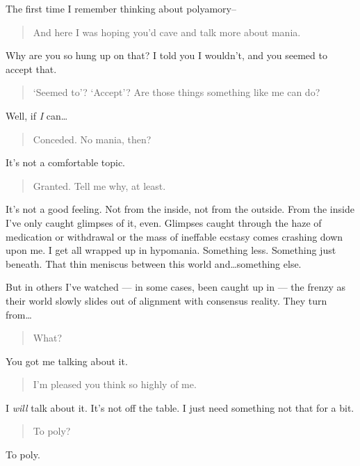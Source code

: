 The first time I remember thinking about polyamory--

\begin{quote}
And here I was hoping you'd cave and talk more about mania.
\end{quote}

Why are you so hung up on that? I told you I wouldn't, and you seemed to accept that.

\begin{quote}
`Seemed to'? `Accept'? Are those things something like me can do?
\end{quote}

Well, if \emph{I} can\ldots{}

\begin{quote}
Conceded. No mania, then?
\end{quote}

It's not a comfortable topic.

\begin{quote}
Granted. Tell me why, at least.
\end{quote}

It's not a good feeling. Not from the inside, not from the outside. From the inside I've only caught glimpses of it, even. Glimpses caught through the haze of medication or withdrawal or the mass of ineffable ecstasy comes crashing down upon me. I get all wrapped up in hypomania. Something less. Something just beneath. That thin meniscus between this world and\ldots{}something else.

But in others I've watched --- in some cases, been caught up in --- the frenzy as their world slowly slides out of alignment with consensus reality. They turn from\ldots{}

\begin{quote}
What?
\end{quote}

You got me talking about it.

\begin{quote}
I'm pleased you think so highly of me.
\end{quote}

I \emph{will} talk about it. It's not off the table. I just need something not that for a bit.

\begin{quote}
To poly?
\end{quote}

To poly.
